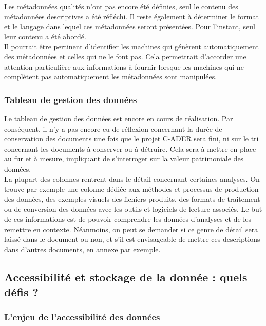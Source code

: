 Les métadonnées qualités n’ont pas encore été définies, seul le contenu des métadonnées descriptives a été réfléchi. Il reste également à déterminer le format et le langage dans lequel ces métadonnées seront présentées. Pour l’instant, seul leur contenu a été abordé.\\

Il pourrait être pertinent d'identifier les machines qui génèrent automatiquement des métadonnées et celles qui ne le font pas. Cela permettrait d'accorder une attention particulière aux informations à fournir lorsque les machines qui ne complètent pas automatiquement les métadonnées sont manipulées.

            \subsubsection{Tableau de gestion des données}

Le tableau de gestion des données est encore en cours de réalisation. Par conséquent, il n’y a pas encore eu de réflexion concernant la durée de conservation des documents une fois que le projet C-ADER sera fini, ni sur le tri concernant les documents à conserver ou à détruire. Cela sera à mettre en place au fur et à mesure, impliquant de s’interroger sur la valeur patrimoniale des données.\\

La plupart des colonnes rentrent dans le détail concernant certaines analyses. On trouve par exemple une colonne dédiée aux méthodes et processus de production des données, des exemples visuels des fichiers produits, des formats de traitement ou de conversion des données avec les outils et logiciels de lecture associés. Le but de ces informations est de pouvoir comprendre les données d’analyses et de les remettre en contexte. Néanmoins, on peut se demander si ce genre de détail sera laissé dans le document ou non, et s’il est envisageable de mettre ces descriptions dans d’autres documents, en annexe par exemple.

        \subsection{Accessibilité et stockage de la donnée : quels défis ?}

            \subsubsection{L’enjeu de l’accessibilité des données }

